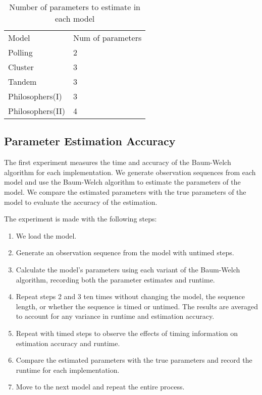 \begin{table}[H]
    \centering
    \caption{Number of parameters to estimate in each model}
    \begin{tabular}{ll}
        \toprule
        Model & Num of parameters \\ 
        Polling & 2 \\ 
        Cluster & 3 \\ 
        Tandem & 3 \\ 
        Philosophers(I) & 3 \\ 
        Philosophers(II) & 4 \\
        \bottomrule
    \end{tabular}
    \label{tab:parameters}
\end{table}

\subsection{Parameter Estimation Accuracy}
The first experiment measures the time and accuracy of the Baum-Welch algorithm for each implementation. We generate observation sequences from each model and use the Baum-Welch algorithm to estimate the parameters of the model. We compare the estimated parameters with the true parameters of the model to evaluate the accuracy of the estimation.

The experiment is made with the following steps:
\begin{enumerate}
    \item We load the model.
    \item Generate an observation sequence from the model with untimed steps.
    \item Calculate the model’s parameters using each variant of the Baum-Welch algorithm, recording both the parameter estimates and runtime.
    \item Repeat steps 2 and 3 ten times without changing the model, the sequence length, or whether the sequence is timed or untimed. The results are averaged to account for any variance in runtime and estimation accuracy.
    \item Repeat with timed steps to observe the effects of timing information on estimation accuracy and runtime.
    \item Compare the estimated parameters with the true parameters and record the runtime for each implementation.
    \item Move to the next model and repeat the entire process.
\end{enumerate}

